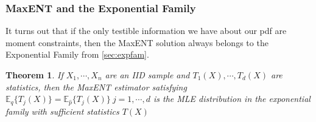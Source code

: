 \documentclass[]{article}
\theoremstyle{mattstyle}
\newtheorem{theorem}{Theorem}[section]
\theoremstyle{definition}
\begin{document}
\newpage

\subsubsection{MaxENT and the Exponential Family}

It turns out that if the only testible information we have about our pdf are moment constraints, then the MaxENT solution always belongs to the Exponential Family from \ref{sec:expfam}.

\begin{theorem}
	If $X_1, \cdots, X_n$ are an IID sample and $T_1(X), \cdots, T_d(X)$ are statistics, then the MaxENT estimator satisfying $\mathbb{E}_{q}\{T_j(X)\} = \mathbb{E}_{\hat{p}}\{T_j(X)\} \ j = 1,\cdots,d$ is the MLE distribution in the exponential family with sufficient statistics $T(X)$
\end{theorem}
\end{document}
